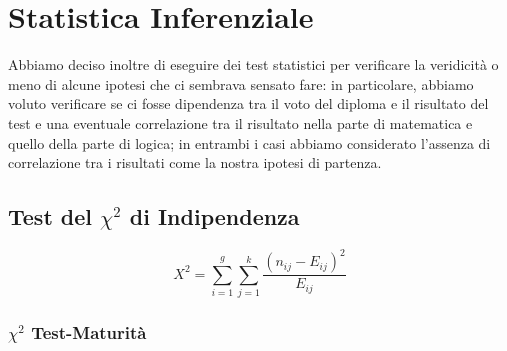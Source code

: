 \section{Statistica Inferenziale}
Abbiamo deciso inoltre di eseguire dei test statistici per verificare la veridicità o meno di alcune ipotesi che ci sembrava sensato fare: in particolare, abbiamo voluto verificare se ci fosse dipendenza tra il voto del diploma e il risultato del test e una eventuale correlazione tra il risultato nella parte di matematica e quello della parte di logica; in entrambi i casi abbiamo considerato l’assenza di correlazione tra i risultati come la nostra ipotesi di partenza.

\subsection{Test del \(\chi^2\) di Indipendenza}

\[
X^2 = \sum_{i=1}^g\sum_{j=1}^k\frac{(n_{ij} - E_{ij})^2}{E_{ij}}
\]
\subsubsection{\(\chi^2\) Test-Maturità}

\begin{center}
\end{center}


\begin{center}
\end{center}

